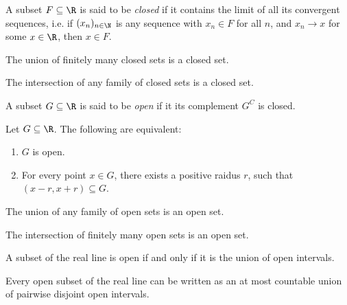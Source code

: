 \documentclass{article}
\begin{document}
\begin{definition}
    A subset $F\subseteq\R$ is said to be \emph{closed} if it contains the limit of all
    its convergent sequences, i.e. if $(x_n)_{n\in\N}$ is any sequence with $x_n\in F$
    for all $n$, and $x_n\to x$ for some $x\in\R$, then $x\in F$.
\end{definition}

\begin{proposition}[Notes 2.2]
    The union of finitely many closed sets is a closed set.
\end{proposition}

\begin{proposition}[Notes 2.4]
    The intersection of any family of closed sets is a closed set.
\end{proposition}

\begin{definition}
    A subset $G\subseteq\R$ is said to be \emph{open} if it its complement $G^C$ is closed.
\end{definition}

\begin{proposition}[Notes 2.6]
    Let $G\subseteq\R$. The following are equivalent:
    \begin{enumerate}
        \item $G$ is open.
        \item For every point $x\in G$, there exists a positive raidus $r$, such that
              $(x-r,x+r)\subseteq G$.
    \end{enumerate}
\end{proposition}

\begin{proposition}[Notes 2.8]
    The union of any family of open sets is an open set.
\end{proposition}

\begin{proposition}[Notes 2.9]
    The intersection of finitely many open sets is an open set.
\end{proposition}

\begin{theorem}[Notes 2.10]
    A subset of the real line is open if and only if it is the union of open intervals.
\end{theorem}

\begin{theorem}[Notes 2.11]
    Every open subset of the real line can be written as an at most countable union
    of pairwise disjoint open intervals.
\end{theorem}
\end{document}
